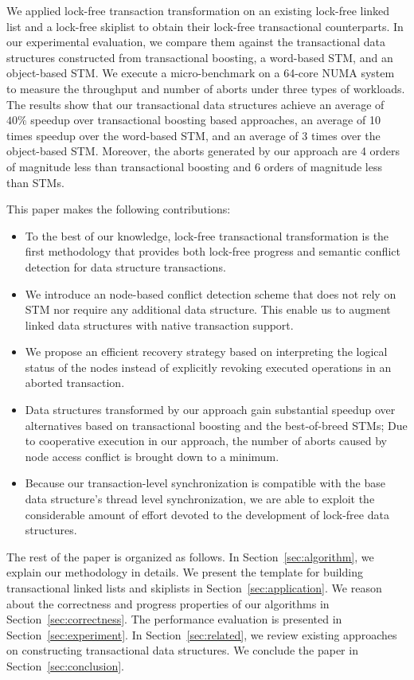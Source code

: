 \documentclass[]{sig-alternate-05-2015}
\begin{document}
We applied lock-free transaction transformation on an existing lock-free linked list and a lock-free skiplist to obtain their lock-free transactional counterparts.
In our experimental evaluation, we compare them against the transactional data structures constructed from transactional boosting, a word-based STM, and an object-based STM.
We execute a micro-benchmark on a 64-core NUMA system to measure the throughput and number of aborts under three types of workloads.
The results show that our transactional data structures achieve an average of $40\%$ speedup over transactional boosting based approaches, an average of 10 times speedup over the word-based STM, and an average of 3 times over the object-based STM.
Moreover, the aborts generated by our approach are 4 orders of magnitude less than transactional boosting and 6 orders of magnitude less than STMs.

This paper makes the following contributions:
\begin{itemize}
    \item To the best of our knowledge, lock-free transactional transformation is the first methodology that provides both lock-free progress and semantic conflict detection for data structure transactions. 
    \item We introduce an node-based conflict detection scheme that does not rely on STM nor require any additional data structure. This enable us to augment linked data structures with native transaction support.
    \item We propose an efficient recovery strategy based on interpreting the logical status of the nodes instead of explicitly revoking executed operations in an aborted transaction.
    \item Data structures transformed by our approach gain substantial speedup over alternatives based on transactional boosting and the best-of-breed STMs; Due to cooperative execution in our approach, the number of aborts caused by node access conflict is brought down to a minimum.
    \item Because our transaction-level synchronization is compatible with the base data structure's thread level synchronization, we are able to exploit the considerable amount of effort devoted to the development of lock-free data structures.
\end{itemize}

The rest of the paper is organized as follows. 
In Section~\ref{sec:algorithm}, we explain our methodology in details.
We present the template for building transactional linked lists and skiplists in Section~\ref{sec:application}.
We reason about the correctness and progress properties of our algorithms in Section~\ref{sec:correctness}.
The performance evaluation is presented in Section~\ref{sec:experiment}.
In Section~\ref{sec:related}, we review existing approaches on constructing transactional data structures.
We conclude the paper in Section~\ref{sec:conclusion}.
\end{document}
